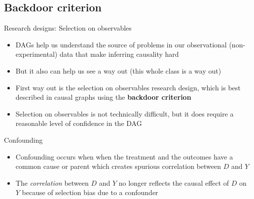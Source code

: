 \documentclass{beamer}
\begin{document}
\subsection{Backdoor criterion}

\begin{frame}{Research designs: Selection on observables}

  \begin{itemize}

    \item DAGs help us understand the source of problems in our observational (non-experimental) data that make inferring causality hard
    \item But it also can help us see a way out (this whole class is a way out)
    \item First way out is the selection on observables research design, which is best described in causal graphs using the \textbf{backdoor criterion}
    \item Selection on observables is not technically difficult, but it does require a reasonable level of confidence in the DAG
  \end{itemize}

\end{frame}

\begin{frame}{Confounding}

  \begin{itemize}
    \item Confounding occurs when when the treatment and the outcomes have a common cause or parent which creates spurious correlation between $D$ and $Y$

          \begin{center}
          \end{center}

          \item The \emph{correlation} between $D$ and $Y$ no longer reflects the causal effect of $D$ on $Y$ because of selection bias due to a confounder
  \end{itemize}
\end{frame}
\end{document}
